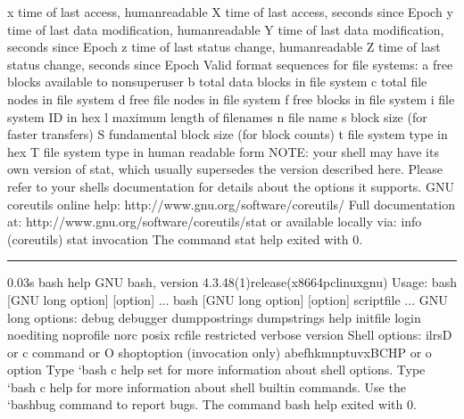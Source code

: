 \documentclass[letterpaper,12pt,english]{sphinxmanual}
\begin{document}
\begin{sphinxVerbatim}[commandchars=\\\{\}]
  \PYGZpc{}x   time of last access, human\PYGZhy{}readable
  \PYGZpc{}X   time of last access, seconds since Epoch
  \PYGZpc{}y   time of last data modification, human\PYGZhy{}readable
  \PYGZpc{}Y   time of last data modification, seconds since Epoch
  \PYGZpc{}z   time of last status change, human\PYGZhy{}readable
  \PYGZpc{}Z   time of last status change, seconds since Epoch
Valid format sequences for file systems:
  \PYGZpc{}a   free blocks available to non\PYGZhy{}superuser
  \PYGZpc{}b   total data blocks in file system
  \PYGZpc{}c   total file nodes in file system
  \PYGZpc{}d   free file nodes in file system
  \PYGZpc{}f   free blocks in file system
  \PYGZpc{}i   file system ID in hex
  \PYGZpc{}l   maximum length of filenames
  \PYGZpc{}n   file name
  \PYGZpc{}s   block size (for faster transfers)
  \PYGZpc{}S   fundamental block size (for block counts)
  \PYGZpc{}t   file system type in hex
  \PYGZpc{}T   file system type in human readable form
NOTE: your shell may have its own version of stat, which usually supersedes
the version described here.  Please refer to your shell\PYGZsq{}s documentation
for details about the options it supports.
GNU coreutils online help: \PYGZlt{}http://www.gnu.org/software/coreutils/\PYGZgt{}
Full documentation at: \PYGZlt{}http://www.gnu.org/software/coreutils/stat\PYGZgt{}
or available locally via: info \PYGZsq{}(coreutils) stat invocation\PYGZsq{}
The command \PYGZdq{}stat \PYGZhy{}\PYGZhy{}help\PYGZdq{} exited with 0.
\end{sphinxVerbatim}


\bigskip\hrule\bigskip


\begin{sphinxVerbatim}[commandchars=\\\{\}]
0.03s\PYGZdl{} bash \PYGZhy{}\PYGZhy{}help
GNU bash, version 4.3.48(1)\PYGZhy{}release\PYGZhy{}(x86\PYGZus{}64\PYGZhy{}pc\PYGZhy{}linux\PYGZhy{}gnu)
Usage: bash [GNU long option] [option] ...
 bash [GNU long option] [option] script\PYGZhy{}file ...
GNU long options:
 \PYGZhy{}\PYGZhy{}debug
 \PYGZhy{}\PYGZhy{}debugger
 \PYGZhy{}\PYGZhy{}dump\PYGZhy{}po\PYGZhy{}strings
 \PYGZhy{}\PYGZhy{}dump\PYGZhy{}strings
 \PYGZhy{}\PYGZhy{}help
 \PYGZhy{}\PYGZhy{}init\PYGZhy{}file
 \PYGZhy{}\PYGZhy{}login
 \PYGZhy{}\PYGZhy{}noediting
 \PYGZhy{}\PYGZhy{}noprofile
 \PYGZhy{}\PYGZhy{}norc
 \PYGZhy{}\PYGZhy{}posix
 \PYGZhy{}\PYGZhy{}rcfile
 \PYGZhy{}\PYGZhy{}restricted
 \PYGZhy{}\PYGZhy{}verbose
 \PYGZhy{}\PYGZhy{}version
Shell options:
 \PYGZhy{}ilrsD or \PYGZhy{}c command or \PYGZhy{}O shopt\PYGZus{}option   (invocation only)
 \PYGZhy{}abefhkmnptuvxBCHP or \PYGZhy{}o option
Type `bash \PYGZhy{}c \PYGZdq{}help set\PYGZdq{}\PYGZsq{} for more information about shell options.
Type `bash \PYGZhy{}c help\PYGZsq{} for more information about shell builtin commands.
Use the `bashbug\PYGZsq{} command to report bugs.
The command \PYGZdq{}bash \PYGZhy{}\PYGZhy{}help\PYGZdq{} exited with 0.
\end{sphinxVerbatim}
\end{document}

